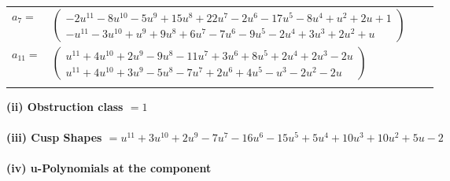 \documentclass[1p]{elsarticle_modified}
\theoremstyle{definition}
\begin{document}
\begin{tabular}{m{7pt} m{180pt} m{7pt} m{180pt} }
\flushright $a_{7}=$&$\begin{pmatrix}-2 u^{11}-8 u^{10}-5 u^9+15 u^8+22 u^7-2 u^6-17 u^5-8 u^4+u^2+2 u+1\\- u^{11}-3 u^{10}+u^9+9 u^8+6 u^7-7 u^6-9 u^5-2 u^4+3 u^3+2 u^2+u\end{pmatrix}$ \\
\flushright $a_{11}=$&$\begin{pmatrix}u^{11}+4 u^{10}+2 u^9-9 u^8-11 u^7+3 u^6+8 u^5+2 u^4+2 u^3-2 u\\u^{11}+4 u^{10}+3 u^9-5 u^8-7 u^7+2 u^6+4 u^5- u^3-2 u^2-2 u\end{pmatrix}$\\&\end{tabular}
\flushleft \textbf{(ii) Obstruction class $= 1$}\\~\\
\flushleft \textbf{(iii) Cusp Shapes $= u^{11}+3 u^{10}+2 u^9-7 u^7-16 u^6-15 u^5+5 u^4+10 u^3+10 u^2+5 u-2$}\\~\\
\newpage\renewcommand{\arraystretch}{1}
\flushleft \textbf{(iv) u-Polynomials at the component}\newline \\
\end{document}
